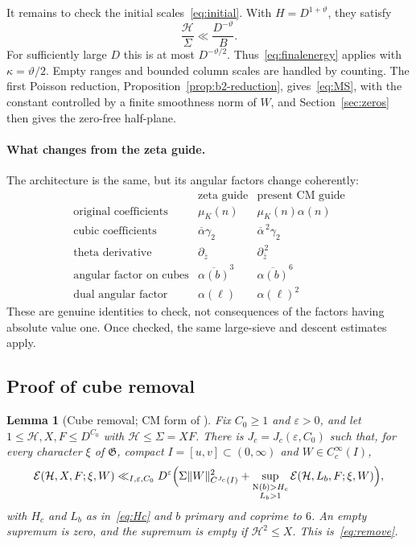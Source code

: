 \documentclass[11pt]{article}
\numberwithin{equation}{section}
\newcommand{\N}{\mathrm N}
\newcommand{\muk}{\mu_K}
\newcommand{\E}{\mathcal E}
\newtheorem{lemma}{Lemma}
\begin{document}
It remains to check the initial scales~\eqref{eq:initial}. With $H=D^{1+\vartheta}$, they
satisfy
\begin{equation}\label{eq:initialratio}
 \frac{\mathcal H}{\Sigma}\ll\frac{D^{-\vartheta}}B.
\end{equation}
For sufficiently large $D$ this is at most $D^{-\vartheta/2}$.
Thus~\eqref{eq:finalenergy} applies with $\kappa=\vartheta/2$.
Empty ranges and bounded column scales are handled by counting.
The first Poisson reduction, Proposition~\ref{prop:b2-reduction}, gives~\eqref{eq:MS},
with the constant controlled by a finite smoothness norm of $W$, and
Section~\ref{sec:zeros} then gives the zero-free half-plane.

\paragraph{What changes from the zeta guide.}
The architecture is the same, but its angular factors change coherently:
\begin{equation}\label{eq:d060}
\begin{array}{c|cc}
 &\text{zeta guide}&\text{present CM guide}\\\hline
 \text{original coefficients}&\muk(n)&\muk(n)\alpha(n)\\
 \text{cubic coefficients}&\overline\alpha\gamma_2&\overline\alpha^{\,2}\gamma_2\\
 \text{theta derivative}&\partial_{\bar z}&\partial_{\bar z}^{\,2}\\
 \text{angular factor on cubes}&\overline{\alpha(b)}^3&\overline{\alpha(b)}^6\\
 \text{dual angular factor}&\alpha(\ell)&\alpha(\ell)^2
\end{array}
\end{equation}
These are genuine identities to check, not consequences of the factors
having absolute value one. Once checked, the same large-sieve and descent
estimates apply.


\subsection{Proof of cube removal}\label{subsec:b4-cube}

\begin{lemma}[Cube removal; CM form of {\cite[Lemma~5.3]{OAI1112}}]\label{lem:b4-cube}
Fix $C_0\ge1$ and $\varepsilon>0$, and let $1\le\mathcal H,X,F\le D^{C_0}$ with
$\mathcal H\le\Sigma=XF$. There is $J_c=J_c(\varepsilon,C_0)$ such that, for every character $\xi$
of $\mathfrak G$, compact $I=[u,v]\subset(0,\infty)$ and $W\in C_c^\infty(I)$,
\begin{equation}\label{eq:d061}
 \E(\mathcal H,X,F;\xi,W)\ll_{I,\varepsilon,C_0}D^\varepsilon\Bigl(\Sigma\|W\|_{C^{J_c}(I)}^2+
 \sup_{\substack{\N(b)>H_c\\L_b>1}}\E(\mathcal H,L_b,F;\xi,W)\Bigr),
\end{equation}
with $H_c$ and $L_b$ as in~\eqref{eq:Hc} and $b$ primary and coprime to $6$. An empty supremum is
zero, and the supremum is empty if $\mathcal H^2\le X$. This is~\eqref{eq:remove}.
\end{lemma}
\end{document}
